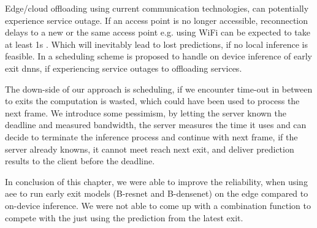 Edge/cloud offloading using current communication technologies, can potentially experience service outage. If an access point is no longer accessible, reconnection delays to a new or the same access point e.g. using WiFi can be expected to take at least 1s \cite{pei_why_2017}. Which will inevitably lead to lost predictions, if no local inference is feasible. In \cite{wang_see:_2019} a scheduling scheme is proposed to handle on device inference of early exit \gls{dnn}s, if experiencing service outages to offloading services.

The down-side of our approach is scheduling, if we encounter time-out in between to exits the computation is wasted, which could have been used to process the next frame. We introduce some pessimism, by letting the server known the deadline and measured bandwidth, the server measures the time it uses and can decide to terminate the inference process and continue with next frame, if the server already knowns, it cannot meet reach next exit, and deliver prediction results to the client before the deadline.

In conclusion of this chapter, we were able to improve the reliability, when using \gls{aee} to run early exit models (B-\gls{resnet} and B-\gls{densenet}) on the edge compared to on-device inference. We were not able to come up with a combination function to compete with the just using the prediction from the latest exit. 
